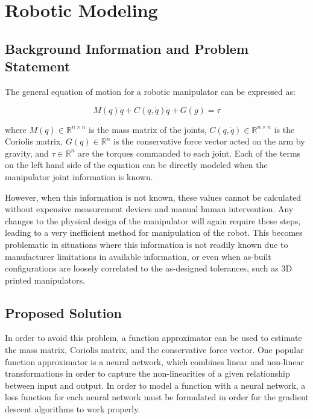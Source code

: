 \section{Robotic Modeling}
\subsection{Background Information and Problem Statement}

The general equation of motion for a robotic manipulator can be expressed as:

\begin{equation}
  \label{eom-manipulator}
  M(q)\ddot{q} + C(q,\dot{q})\dot{q} + G(g) = \tau
\end{equation}

\noindent where $M(q)\in\mathbb{R}^{n\times n}$ is the mass matrix of the joints,
$C(q,\dot{q})\in\mathbb{R}^{n\times n}$ is the Coriolis matrix,
$G(q)\in\mathbb{R}^{n}$ is the conservative force vector acted on the arm by
gravity, and $\tau\in\mathbb{R}^{n}$ are the torques commanded to each joint.
Each of the terms on the left hand side of the equation can be directly modeled
when the manipulator joint information is known.

However, when this information is not known, these values cannot be calculated
without expensive measurement devices and manual human intervention. Any changes
to the physical design of the manipulator will again require these steps,
leading to a very inefficient method for manipulation of the robot. This becomes
problematic in situations where this information is not readily known due to
manufacturer limitations in available information, or even when as-built
configurations are loosely correlated to the as-designed tolerances, such as 3D
printed manipulators.

\subsection{Proposed Solution}
In order to avoid this problem, a function approximator can be used to estimate
the mass matrix, Coriolis matrix, and the conservative force vector.
One popular function approximator is a neural network, which combines linear and
non-linear transformations in order to capture the non-linearities of a given
relationship between input and output.
In order to model a function with a neural network, a loss function for each
neural network must be formulated in order for the gradient descent algorithms
to work properly.

